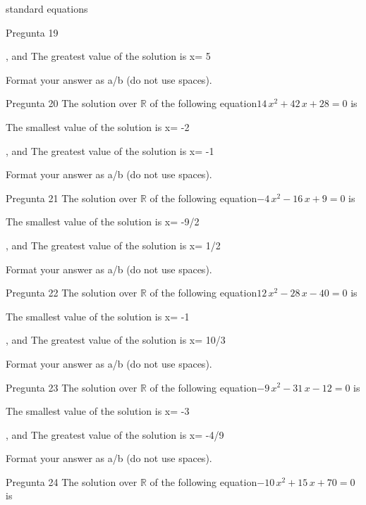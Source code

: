 \begin{quiz}{standard equations }
\begin{cloze}{Pregunta 19 }
\begin{shortanswer}, and  The greatest value of the solution is x=  5 \end{shortanswer}
Format your answer as a/b (do not use spaces).\end{cloze}\begin{cloze}{Pregunta 20 } The solution over $\mathbb{R}$ of the following equation$ 14\,x^2+42\,x+28=0  $ is 
\begin{shortanswer}The smallest value of the solution is x=  -2 \end{shortanswer}
\begin{shortanswer}, and  The greatest value of the solution is x=  -1 \end{shortanswer}
Format your answer as a/b (do not use spaces).\end{cloze}\begin{cloze}{Pregunta 21 } The solution over $\mathbb{R}$ of the following equation$ -4\,x^2-16\,x+9=0  $ is 
\begin{shortanswer}The smallest value of the solution is x=  -9/2 \end{shortanswer}
\begin{shortanswer}, and  The greatest value of the solution is x=  1/2 \end{shortanswer}
Format your answer as a/b (do not use spaces).\end{cloze}\begin{cloze}{Pregunta 22 } The solution over $\mathbb{R}$ of the following equation$ 12\,x^2-28\,x-40=0  $ is 
\begin{shortanswer}The smallest value of the solution is x=  -1 \end{shortanswer}
\begin{shortanswer}, and  The greatest value of the solution is x=  10/3 \end{shortanswer}
Format your answer as a/b (do not use spaces).\end{cloze}\begin{cloze}{Pregunta 23 } The solution over $\mathbb{R}$ of the following equation$ -9\,x^2-31\,x-12=0  $ is 
\begin{shortanswer}The smallest value of the solution is x=  -3 \end{shortanswer}
\begin{shortanswer}, and  The greatest value of the solution is x=  -4/9 \end{shortanswer}
Format your answer as a/b (do not use spaces).\end{cloze}\begin{cloze}{Pregunta 24 } The solution over $\mathbb{R}$ of the following equation$ -10\,x^2+15\,x+70=0  $ is 

\end{cloze}
\end{quiz}

